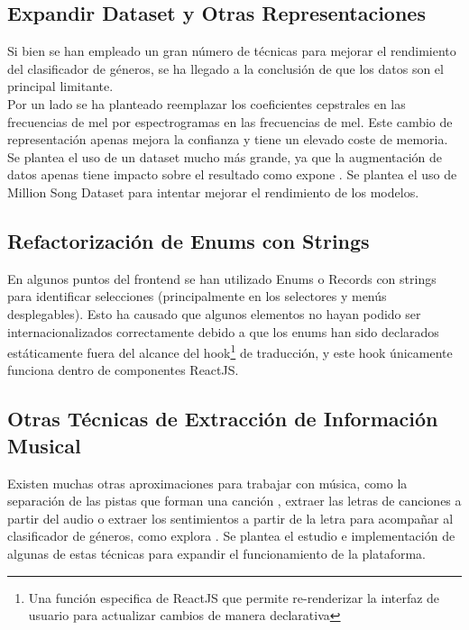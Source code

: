 \subsection{Expandir Dataset y Otras Representaciones}
Si bien se han empleado un gran número de técnicas para mejorar el rendimiento del clasificador de géneros, se ha llegado a la conclusión de que los datos son el principal limitante.\\
Por un lado se ha planteado reemplazar los coeficientes cepstrales en las frecuencias de mel por espectrogramas en las frecuencias de mel. Este cambio de representación apenas mejora la confianza y tiene un elevado coste de memoria.\\
Se plantea el uso de un dataset mucho más grande, ya que la augmentación de datos apenas tiene impacto sobre el resultado como expone \cite{augmentation}. Se plantea el uso de Million Song Dataset \cite{million_song_dataset} para intentar mejorar el rendimiento de los modelos. 

\subsection{Refactorización de Enums con Strings}
En algunos puntos del frontend se han utilizado Enums o Records con strings para identificar selecciones (principalmente en los selectores y menús desplegables). 
Esto ha causado que algunos elementos no hayan podido ser internacionalizados correctamente debido a que los enums han sido declarados estáticamente fuera del alcance del hook\footnote{Una función especifica de ReactJS que permite re-renderizar la interfaz de usuario para actualizar cambios de manera declarativa} de traducción, y este hook únicamente funciona dentro de componentes ReactJS.

\subsection{Otras Técnicas de Extracción de Información Musical}
Existen muchas otras aproximaciones para trabajar con música, como la separación de las pistas que forman una canción \cite{demucs}, extraer las letras de canciones a partir del audio o extraer los sentimientos a partir de la letra para acompañar al clasificador de géneros, como explora \cite{moods_classification}.
Se plantea el estudio e implementación de algunas de estas técnicas para expandir el funcionamiento de la plataforma.